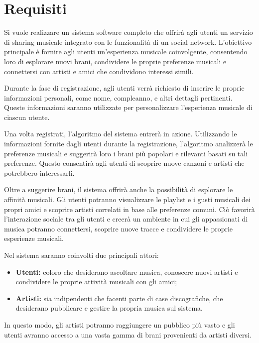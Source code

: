\section{Requisiti}

Si vuole realizzare un sistema software completo che offrirà agli utenti un servizio di sharing musicale 
integrato con le funzionalità di un social network. L'obiettivo principale è fornire agli utenti un'esperienza 
musicale coinvolgente, consentendo loro di esplorare nuovi brani, condividere le proprie preferenze musicali e 
connettersi con artisti e amici che condividono interessi simili.

Durante la fase di registrazione, agli utenti verrà richiesto di inserire le proprie informazioni personali, 
come nome, compleanno, e altri dettagli pertinenti. Queste informazioni saranno utilizzate per personalizzare 
l'esperienza musicale di ciascun utente.

Una volta registrati, l'algoritmo del sistema entrerà in azione. Utilizzando le informazioni fornite dagli utenti 
durante la registrazione, l'algoritmo analizzerà le preferenze musicali e suggerirà loro i brani più popolari e 
rilevanti basati su tali preferenze. Questo consentirà agli utenti di scoprire nuove canzoni e artisti che potrebbero interessarli.

Oltre a suggerire brani, il sistema offrirà anche la possibilità di esplorare le affinità musicali. 
Gli utenti potranno visualizzare le playlist e i gusti musicali dei propri amici e scoprire artisti 
correlati in base alle preferenze comuni. Ciò favorirà l'interazione sociale tra gli utenti e creerà
 un ambiente in cui gli appassionati di musica potranno connettersi, scoprire nuove tracce e condividere le proprie esperienze musicali.

Nel sistema saranno coinvolti due principali attori:  
\begin{itemize}
      \item \textbf{Utenti:} coloro che desiderano ascoltare musica, conoscere nuovi artisti e condividere 
      le proprie attività musicali con gli amici;
      \item \textbf{Artisti:} sia indipendenti che facenti parte di case discografiche, che desiderano 
      pubblicare e gestire la propria musica sul sistema.
\end{itemize}

In questo modo, gli artisti potranno raggiungere un pubblico più vasto e gli utenti avranno accesso a una vasta gamma 
di brani provenienti da artisti diversi.

